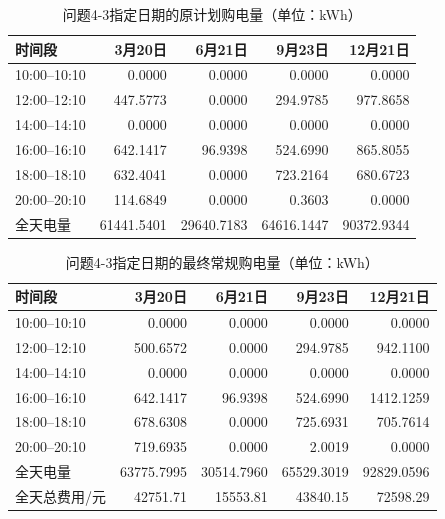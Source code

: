\begin{table}[H]
\centering\small
\caption{问题4-3指定日期的原计划购电量（单位：kWh）}\label{tab:q4_4-3-original}
\begin{tabular}{lrrrr}
\toprule
时间段 & 3月20日 & 6月21日 & 9月23日 & 12月21日\\
\midrule
10:00--10:10 & 0.0000 & 0.0000 & 0.0000 & 0.0000\\
12:00--12:10 & 447.5773 & 0.0000 & 294.9785 & 977.8658\\
14:00--14:10 & 0.0000 & 0.0000 & 0.0000 & 0.0000\\
16:00--16:10 & 642.1417 & 96.9398 & 524.6990 & 865.8055\\
18:00--18:10 & 632.4041 & 0.0000 & 723.2164 & 680.6723\\
20:00--20:10 & 114.6849 & 0.0000 & 0.3603 & 0.0000\\
全天电量 & 61441.5401 & 29640.7183 & 64616.1447 & 90372.9344\\
\bottomrule
\end{tabular}
\end{table}
\begin{table}[H]
\centering\small
\caption{问题4-3指定日期的最终常规购电量（单位：kWh）}\label{tab:q4_4-3-final}
\begin{tabular}{lrrrr}
\toprule
时间段 & 3月20日 & 6月21日 & 9月23日 & 12月21日\\
\midrule
10:00--10:10 & 0.0000 & 0.0000 & 0.0000 & 0.0000\\
12:00--12:10 & 500.6572 & 0.0000 & 294.9785 & 942.1100\\
14:00--14:10 & 0.0000 & 0.0000 & 0.0000 & 0.0000\\
16:00--16:10 & 642.1417 & 96.9398 & 524.6990 & 1412.1259\\
18:00--18:10 & 678.6308 & 0.0000 & 725.6931 & 705.7614\\
20:00--20:10 & 719.6935 & 0.0000 & 2.0019 & 0.0000\\
全天电量 & 63775.7995 & 30514.7960 & 65529.3019 & 92829.0596\\
全天总费用/元 & 42751.71 & 15553.81 & 43840.15 & 72598.29\\
\bottomrule
\end{tabular}
\end{table}
